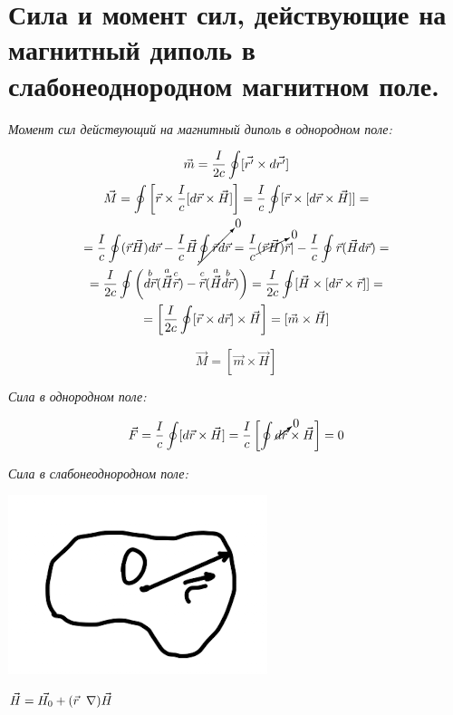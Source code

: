 \section{Сила и момент сил, действующие на магнитный диполь в
слабонеоднородном магнитном поле.}

\textit{Момент сил действующий на магнитный диполь в однородном поле:}

\begin{gather*}
    \vec{m}=\frac{I}{2c} \oint [\vec{r'}\times d \vec{r'}] \\
    \vec{M}=\oint \left[ \vec{r}\times \frac{I}{c} [d\vec{r}\times \vec{H}]  \right]=\frac{I}{c}\oint [\vec{r}\times [d\vec{r}\times \vec{H}]]= \\
    =\frac{I}{c}\oint (\vec{r}\vec{H})d\vec{r} -\frac{I}{c}\vec{H} \cancelto{0}{\oint \vec{r}d\vec{r}}=\frac{I}{c} \cancelto{0}{(\vec{r}\vec{H})}\vec{r}|-\frac{I}{c}\oint \vec{r}(\vec{H}d\vec{r})= \\
    =\frac{I}{2c}\oint \left( \overset{b}{d\vec{r}}(\overset{a}{\vec{H}}\overset{c}{\vec{r}})-\overset{c}{\vec{r}}(\overset{a}{\vec{H}}\overset{b}{d\vec{r}}) \right)=\frac{I}{2c}\oint[\vec{H}\times [d\vec{r}\times \vec{r}]]= \\
    =\left[ \frac{I}{2c}\oint[\vec{r}\times d\vec{r}]\times \vec{H}  \right]=[\vec{m}\times \vec{H}]     
\end{gather*}

\[
\boxed{\vec{M}=[\vec{m}\times \vec{H}]}
\]

\textit{Сила в однородном поле:}

\[
\vec{F}=\frac{I}{c}\oint [d\vec{r}\times \vec{H}]=\frac{I}{c} \left[ \oint \cancelto{0}{d\vec{r}}\times \vec{H} \right] =0
\]

\textit{Сила в слабонеоднородном поле:}

\begin{minipage}[c]{0.25\textwidth} %
    \includegraphics[width=\textwidth]{im/71.png} %
\end{minipage}%
\hfill
\begin{minipage}[c]{0.55\textwidth} %
    \( \vec{H}=\vec{H_0}+(\vec{r}\hspace{0.2cm}\scriptsize \nabla)\vec{H} \) 
\end{minipage}

